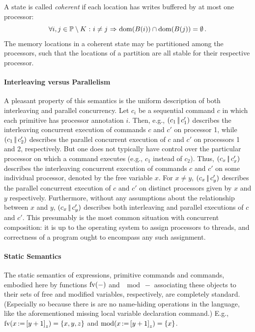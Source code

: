 \documentclass[11pt]{report}
\begin{document}
A state is called \emph{coherent} if each location has writes buffered by at most one processor: \[ \forall i,j \in \mathbb{P} \setminus K \operatorname{\,:\,} i \neq j \operatorname{\,\Rightarrow\,} \operatorname{\mathrm{dom}}(B(i)) \cap \operatorname{\mathrm{dom}}(B(j)) = \operatorname{\emptyset}.\] The memory locations in a coherent state may be partitioned among the processors, such that the locations of a partition are all stable for their respective processor.

\paragraph{Interleaving versus Parallelism} A pleasant property of this semantics is the uniform description of both interleaving and parallel concurrency. Let $c_i$ be a sequential command $c$ in which each primitive has processor annotation $i$. Then, e.g., $(c_1 \operatorname{|\!|} c'_1)$ describes the interleaving concurrent execution of commands $c$ and $c'$ on processor 1, while $(c_1 \operatorname{|\!|} c'_2)$ describes the parallel concurrent execution of $c$ and $c'$ on processors 1 and 2, respectively. But one does not typically have control over the particular processor on which a command executes (e.g., $c_1$ instead of $c_2$). Thus, $(c_x \operatorname{|\!|} c'_x)$ describes the interleaving concurrent execution of commands $c$ and $c'$ on some individual processor, denoted by the free variable $x$. For $x \neq y$, $(c_x \operatorname{|\!|} c'_y)$ describes the parallel concurrent execution of $c$ and $c'$ on distinct processors given by $x$ and $y$ respectively. Furthermore, without any assumptions about the relationship between $x$ and $y$, $(c_x \operatorname{|\!|} c'_y)$ describes both interleaving and parallel executions of $c$ and $c'$. This presumably is the most common situation with concurrent composition: it is up to the operating system to assign processors to threads, and correctness of a program ought to encompass any such assignment.

\paragraph{Static Semantics} The static semantics of expressions, primitive commands and commands, embodied here by functions $\mathrm{fv}(-)$ and $\mod{-}$ associating these objects to their sets of free and modified variables, respectively, are completely standard. (Especially so because there is are no name-hiding operations in the language, like the aforementioned missing local variable declaration command.) E.g., $\mathrm{fv}(x \operatorname{:\!=} \left[ y+1 \right]_z) = \left\lbrace x,y,z \right\rbrace$ and $\mathrm{mod}(x \operatorname{:\!=} \left[ y+1 \right]_z) = \left\lbrace x \right\rbrace$.  
\end{document}

